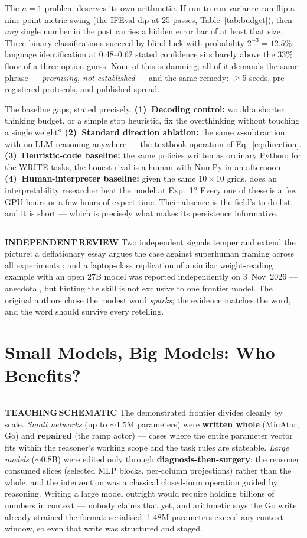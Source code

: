 \documentclass[11pt,a4paper]{article}
\newcommand{\bR}{\textcolor{wspgreen}{\rule[0.12ex]{1.5mm}{1.5mm}}\;\textcolor{wspgreen}{\textbf{INDEPENDENT\,REVIEW}}}
\newcommand{\bS}{\textcolor{wspamber}{\rule[0.12ex]{1.5mm}{1.5mm}}\;\textcolor{wspamber}{\textbf{TEACHING\,SCHEMATIC}}}
\begin{document}
The $n{=}1$ problem deserves its own arithmetic. If run-to-run variance can flip a nine-point metric swing (the IFEval dip at 25 passes, Table~\ref{tab:budget}), then \emph{any} single number in the post carries a hidden error bar of at least that size. Three binary classifications succeed by blind luck with probability $2^{-3} = 12.5\%$; language identification at 0.48--0.62 stated confidence sits barely above the 33\% floor of a three-option guess. None of this is damning; all of it demands the same phrase --- \emph{promising, not established} --- and the same remedy: $\geq$5 seeds, pre-registered protocols, and published spread.

The baseline gaps, stated precisely. \textbf{(1)~Decoding control:} would a shorter thinking budget, or a simple stop heuristic, fix the overthinking without touching a single weight? \textbf{(2)~Standard direction ablation:} the same $u$-subtraction with no LLM reasoning anywhere --- the textbook operation of Eq.~\eqref{eq:direction}. \textbf{(3)~Heuristic-code baseline:} the same policies written as ordinary Python; for the WRITE tasks, the honest rival is a human with NumPy in an afternoon. \textbf{(4)~Human-interpreter baseline:} given the same $10{\times}10$ grids, does an interpretability researcher beat the model at Exp.~1? Every one of these is a few GPU-hours or a few hours of expert time. Their absence is the field's to-do list, and it is short --- which is precisely what makes its persistence informative.

\bR\; Two independent signals temper and extend the picture: a deflationary essay argues the case against superhuman framing across all experiments \cite{goedecke}; and a laptop-class replication of a similar weight-reading example with an open 27B model was reported independently on 3~Nov~2026 \cite{willison} --- anecdotal, but hinting the skill is not exclusive to one frontier model. The original authors chose the modest word \emph{sparks}; the evidence matches the word, and the word should survive every retelling.

\section{Small Models, Big Models: Who Benefits?}\label{sec:sizes}

\bS\; The demonstrated frontier divides cleanly by scale. \emph{Small networks} (up to ${\sim}$1.5M parameters) were \textbf{written whole} (MinAtar, Go) and \textbf{repaired} (the ramp actor) --- cases where the entire parameter vector fits within the reasoner's working scope and the task rules are stateable. \emph{Large models} (${\sim}0.8$B) were edited only through \textbf{diagnosis-then-surgery}: the reasoner consumed slices (selected MLP blocks, per-column projections) rather than the whole, and the intervention was a classical closed-form operation guided by reasoning. Writing a large model outright would require holding billions of numbers in context --- nobody claims that yet, and arithmetic says the Go write already strained the format: serialised, 1.48M parameters exceed any context window, so even that write was structured and staged.
\end{document}
